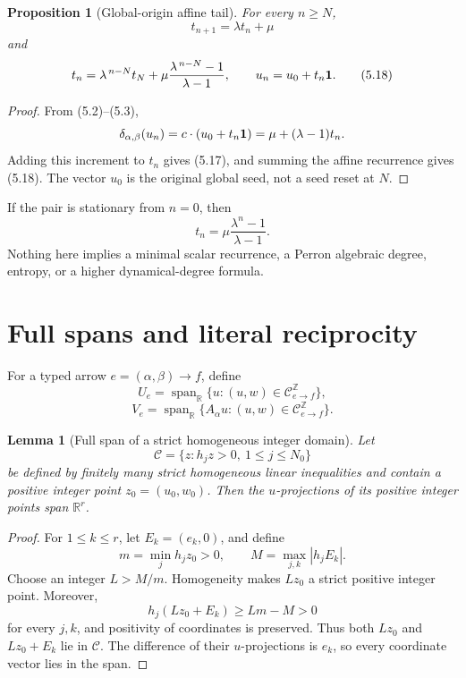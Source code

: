 \documentclass[11pt]{article}
\newtheorem{proposition}[theorem]{Proposition}
\newtheorem{lemma}[theorem]{Lemma}
\theoremstyle{definition}
\theoremstyle{remark}
\begin{document}
\begin{proposition}[Global-origin affine tail]
\label{prop:tail}
For every \(n\geq N\),
\[
 t_{n+1}=\lambda t_n+\mu
\tag{5.17}
\]
and
\[
 t_n=\lambda^{\,n-N}t_N+
 \mu\frac{\lambda^{\,n-N}-1}{\lambda-1},
 \qquad u_n=u_0+t_n\mathbf{1}.
\tag{5.18}
\]
\end{proposition}

\begin{proof}
From (5.2)--(5.3),
\[
 \delta_{\alpha,\beta}(u_n)
 =c\cdot(u_0+t_n\mathbf{1})
 =\mu+(\lambda-1)t_n.
\]
Adding this increment to \(t_n\) gives (5.17), and summing the affine
recurrence gives (5.18).  The vector \(u_0\) is the original global seed,
not a seed reset at \(N\).
\end{proof}

If the pair is stationary from \(n=0\), then
\[
 t_n=\mu\frac{\lambda^n-1}{\lambda-1}.
\]
Nothing here implies a minimal scalar recurrence, a Perron algebraic degree,
entropy, or a higher dynamical-degree formula.

\section{Full spans and literal reciprocity}

For a typed arrow \(e=(\alpha,\beta)\to f\), define
\[
 U_e=\operatorname{span}_{\mathbb R}
 \{u:(u,w)\in\mathcal C_{e\to f}^{\mathbb Z}\},
\]
\[
 V_e=\operatorname{span}_{\mathbb R}
 \{A_\alpha u:(u,w)\in\mathcal C_{e\to f}^{\mathbb Z}\}.
\]

\begin{lemma}[Full span of a strict homogeneous integer domain]
\label{lem:full-span}
Let
\[
 \mathcal C=\{z:h_jz>0,\ 1\leq j\leq N_0\}
\]
be defined by finitely many strict homogeneous linear inequalities and
contain a positive integer point \(z_0=(u_0,w_0)\).  Then the
\(u\)-projections of its positive integer points span \(\mathbb R^r\).
\end{lemma}

\begin{proof}
For \(1\leq k\leq r\), let \(E_k=(e_k,0)\), and define
\[
 m=\min_jh_jz_0>0,\qquad M=\max_{j,k}|h_jE_k|.
\]
Choose an integer \(L>M/m\).  Homogeneity makes \(Lz_0\) a strict positive
integer point.  Moreover,
\[
 h_j(Lz_0+E_k)\geq Lm-M>0
\]
for every \(j,k\), and positivity of coordinates is preserved.  Thus both
\(Lz_0\) and \(Lz_0+E_k\) lie in \(\mathcal C\).  The difference of their
\(u\)-projections is \(e_k\), so every coordinate vector lies in the span.
\end{proof}
\end{document}

